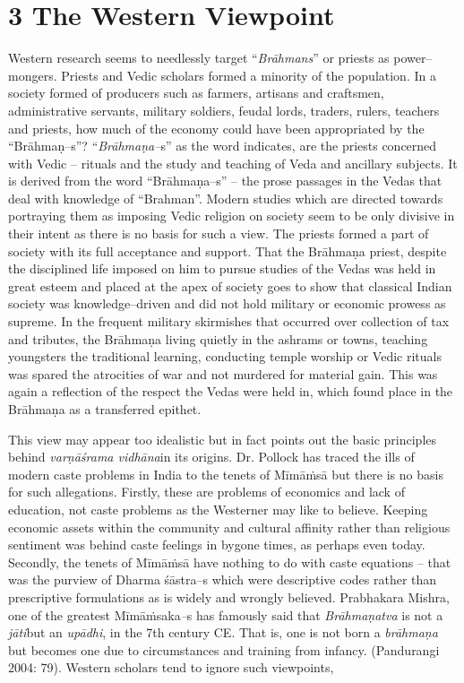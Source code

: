 \section*{3 The Western Viewpoint}

Western research seems to needlessly target “\textit{Brāhmans}” or priests as power–mongers. Priests and Vedic scholars formed a minority of the population. In a society formed of producers such as farmers, artisans and craftsmen, administrative servants, military soldiers, feudal lords, traders, rulers, teachers and priests, how much of the economy could have been appropriated by the “Brāhmaṇ–s”? “\textit{Brāhmaṇa–}s” as the word indicates, are the priests concerned with Vedic – rituals and the study and teaching of Veda and ancillary subjects. It is derived from the word “Brāhmaṇa–s” – the prose passages in the Vedas that deal with knowledge of “Brahman”. Modern studies which are directed towards portraying them as imposing Vedic religion on society seem to be only divisive in their intent as there is no basis for such a view. The priests formed a part of society with its full acceptance and support. That the Brāhmaṇa priest, despite the disciplined life imposed on him to pursue studies of the Vedas was held in great esteem and placed at the apex of society goes to show that classical Indian society was knowledge–driven and did not hold military or economic prowess as supreme. In the frequent military skirmishes that occurred over collection of tax and tributes, the Brāhmaṇa living quietly in the ashrams or towns, teaching youngsters the traditional learning, conducting temple worship or Vedic rituals was spared the atrocities of war and not murdered for material gain. This was again a reflection of the respect the Vedas were held in, which found place in the Brāhmaṇa as a transferred epithet.

This view may appear too idealistic but in fact points out the basic principles behind \textit{varṇāśrama vidhāna}in its origins. Dr. Pollock has traced the ills of modern caste problems in India to the tenets of Mīmāṁsā but there is no basis for such allegations. Firstly, these are problems of economics and lack of education, not caste problems as the Westerner may like to believe. Keeping economic assets within the community and cultural affinity rather than religious sentiment was behind caste feelings in bygone times, as perhaps even today. Secondly, the tenets of Mīmāṁsā have nothing to do with caste equations – that was the purview of Dharma śāstra–s which were descriptive codes rather than prescriptive formulations as is widely and wrongly believed. Prabhakara Mishra, one of the greatest Mīmāṁsaka\textit{–}s has famously said that \textit{Brāhmaṇatva} is not a \textit{jāti}but an \textit{upādhi}, in the 7th century CE. That is, one is not born a \textit{brāhmaṇa} but becomes one due to circumstances and training from infancy. (Pandurangi 2004: 79). Western scholars tend to ignore such viewpoints,

